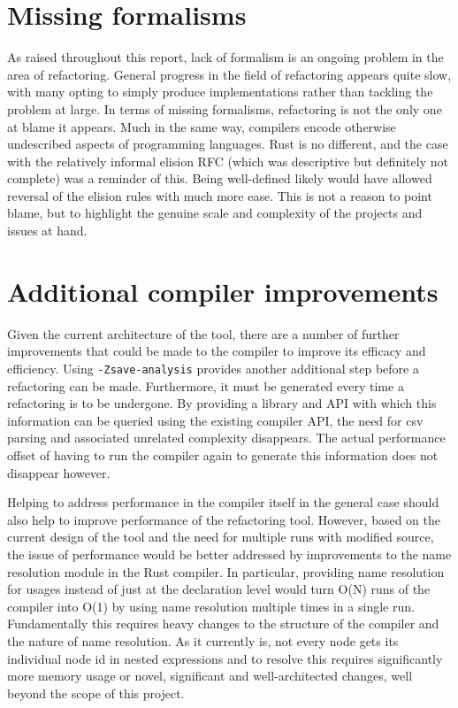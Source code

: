 \section{Missing formalisms}
As raised throughout this report, lack of formalism is an ongoing problem in the area of refactoring. General progress in the field of refactoring appears quite slow, with many opting to simply produce implementations rather than tackling the problem at large. In terms of missing formalisms, refactoring is not the only one at blame it appears. Much in the same way, compilers encode otherwise undescribed aspects of programming languages. Rust is no different, and the case with the relatively informal elision RFC (which was descriptive but definitely not complete) was a reminder of this. Being well-defined likely would have allowed reversal of the elision rules with much more ease. This is not a reason to point blame, but to highlight the genuine scale and complexity of the projects and issues at hand. 

\section{Additional compiler improvements}
Given the current architecture of the tool, there are a number of further improvements that could be made to the compiler to improve its efficacy and efficiency. Using {\verb|-Zsave-analysis|} provides another additional step before a refactoring can be made. Furthermore, it must be generated every time a refactoring is to be undergone. By providing a library and API with which this information can be queried using the existing compiler API, the need for csv parsing and associated unrelated complexity disappears. The actual performance offset of having to run the compiler again to generate this information does not disappear however.  



Helping to address performance in the compiler itself in the general case should also help to improve performance of the refactoring tool. However, based on the current design of the tool and the need for multiple runs with modified source, the issue of performance would be better addressed by improvements to the name resolution module in the Rust compiler. In particular, providing name resolution for usages instead of just at the declaration level would turn O(N) runs of the compiler into O(1) by using name resolution multiple times in a single run. Fundamentally this requires heavy changes to the structure of the compiler and the nature of name resolution. As it currently is, not every node gets its individual node id in nested expressions and to resolve this requires significantly more memory usage or novel, significant and well-architected changes, well beyond the scope of this project.

